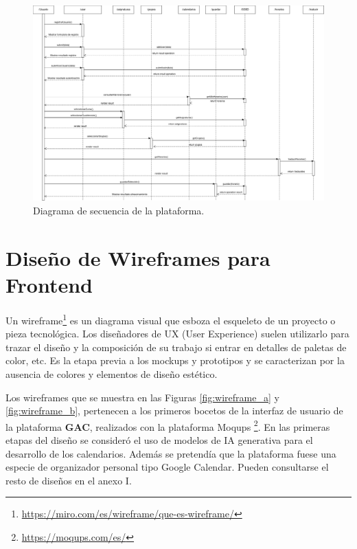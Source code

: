 \begin{landscape}
    \begin{figure}[H]
        \centering
        \includegraphics[width=1.35\textwidth]{./imagenes/Secuencia_Diagrama.png}
        \caption{Diagrama de secuencia de la plataforma.}
        \label{fig:sequence_diagram}
    \end{figure}    
\end{landscape}

\section{Diseño de Wireframes para Frontend}

Un wireframe\footnote{\url{https://miro.com/es/wireframe/que-es-wireframe/}} es un diagrama visual que esboza el esqueleto de un proyecto o pieza tecnológica. Los diseñadores de UX (User Experience) suelen utilizarlo para trazar el diseño y la composición de su trabajo si entrar en detalles de paletas de color, etc. Es la etapa previa a los mockups y prototipos y se caracterizan por la ausencia de colores y elementos de diseño estético.\newline

Los wireframes que se muestra en las Figuras \ref{fig:wireframe_a} y \ref{fig:wireframe_b}, pertenecen a los primeros bocetos de la interfaz de usuario de la plataforma \textbf{GAC}, realizados con la plataforma Moqups \footnote{\url{https://moqups.com/es/}}. En las primeras etapas del diseño se consideró el uso de modelos de IA generativa para el desarrollo de los calendarios. Además se pretendía que la plataforma fuese una especie de organizador personal tipo Google Calendar. Pueden consultarse el resto de diseños en el anexo I.\newline



